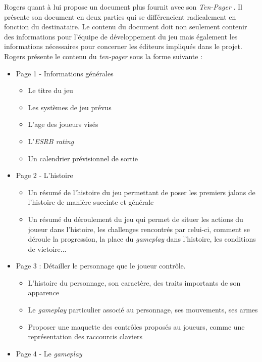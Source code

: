 Rogers \cite{LevelUpRogers2014} quant à lui propose un document plus fournit avec son \emph{\guillemotleft Ten-Pager \guillemotright}. Il présente son document en deux parties qui se différencient radicalement en fonction du destinataire. Le contenu du document doit non seulement contenir des informations pour l'équipe de développement du jeu mais également les informations nécessaires pour concerner les éditeurs impliqués dans le projet. Rogers présente le contenu du \emph{ten-pager} sous la forme suivante :
\begin{itemize}
    \item Page 1 - Informations générales
    \begin{itemize}
        \item Le titre du jeu
        \item Les systèmes de jeu prévus
        \item L'age des joueurs visés
        \item L'\emph{ESRB rating}
        \item Un calendrier prévisionnel de sortie
    \end{itemize}
    \item Page 2 - L'histoire
    \begin{itemize}
        \item Un résumé de l'histoire du jeu permettant de poser les premiers jalons de l'histoire de manière succinte et générale
        \item Un résumé du déroulement du jeu qui permet de situer les actions du joueur dans l'histoire, les challenges rencontrés par celui-ci, comment se déroule la progression, la place du \emph{gameplay} dans l'histoire, les conditions de victoire...
    \end{itemize}
    \item Page 3 : Détailler le personnage que le joueur contrôle.
    \begin{itemize}
        \item L'histoire du personnage, son caractère, des traits importants de son apparence
        \item Le \emph{gameplay} particulier associé au personnage, ses mouvements, ses armes
        \item Proposer une maquette des contrôles proposés au joueurs, comme une représentation des raccourcis claviers
    \end{itemize}
    \item Page 4 - Le \emph{gameplay} 
    \begin{itemize}

\end{itemize}
\end{itemize}

